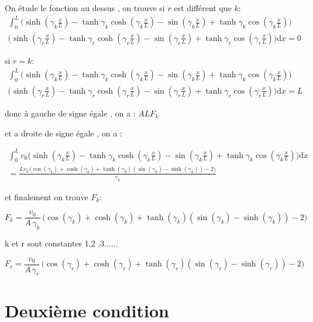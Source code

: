 \documentclass[a4paper,10pt]{report} %
\begin{document}
On étude le fonction au dessus , on trouve si $r$ est différent que $k$:
\begin{align}
    \int_0^L \Big(\sinh{(\gamma_k\frac{x}{L})}-\tanh{\gamma_k}\cosh{(\gamma_k\frac{x}{L})}-\sin{(\gamma_k\frac{x}{L})}+\tanh{\gamma_k}\cos{(\gamma_k\frac{x}{L})}\Big)\\
    \Big(\sinh{(\gamma_r\frac{x}{L})}-\tanh{\gamma_r}\cosh{(\gamma_r\frac{x}{L})}-\sin{(\gamma_r\frac{x}{L})}+\tanh{\gamma_r}\cos{(\gamma_r\frac{x}{L})}\Big)\mathrm dx=0
\end{align}

si $r=k$:
\begin{align}
    \int_0^L \Big(\sinh{(\gamma_k\frac{x}{L})}-\tanh{\gamma_k}\cosh{(\gamma_k\frac{x}{L})}-\sin{(\gamma_k\frac{x}{L})}+\tanh{\gamma_k}\cos{(\gamma_k\frac{x}{L})}\Big)\\
    \Big(\sinh{(\gamma_r\frac{x}{L})}-\tanh{\gamma_r}\cosh{(\gamma_r\frac{x}{L})}-\sin{(\gamma_r\frac{x}{L})}+\tanh{\gamma_r}\cos{(\gamma_r\frac{x}{L})}\Big)\mathrm dx=L
\end{align}

donc à gauche de signe égale , on a : $ALF_k$


et a droite de signe égale , on a :


\begin{align}
    \int_0^L v_0\Big(\sinh{(\gamma_k\frac{x}{L})}-\tanh{\gamma_k}\cosh{(\gamma_k\frac{x}{L})}-\sin{(\gamma_k\frac{x}{L})}+\tanh{\gamma_k}\cos{(\gamma_k\frac{x}{L})}\Big)\mathrm dx\\
    =\frac{L v_0\,\Big(\cos(\gamma_k)+\cosh(\gamma_k)+\tanh(\gamma_k)(\sin(\gamma_k)-\sinh(\gamma_k))-2\Big)}{\gamma_k}
\end{align}


et finalement on trouve $F_k$:

\begin{equation}
    F_k=\frac{v_0}{A\,\gamma_k}\,\Big(\cos(\gamma_k)+\cosh(\gamma_k)+\tanh(\gamma_k)(\sin(\gamma_k)-\sinh(\gamma_k))-2\Big)
\end{equation}

k et r sont constantes 1,2 ,3......

\begin{equation}
    F_r=\frac{v_0}{A\,\gamma_r}\,\Big(\cos(\gamma_r)+\cosh(\gamma_r)+\tanh(\gamma_r)(\sin(\gamma_r)-\sinh(\gamma_r))-2\Big)
\end{equation}


\section{Deuxième condition}
\end{document}
